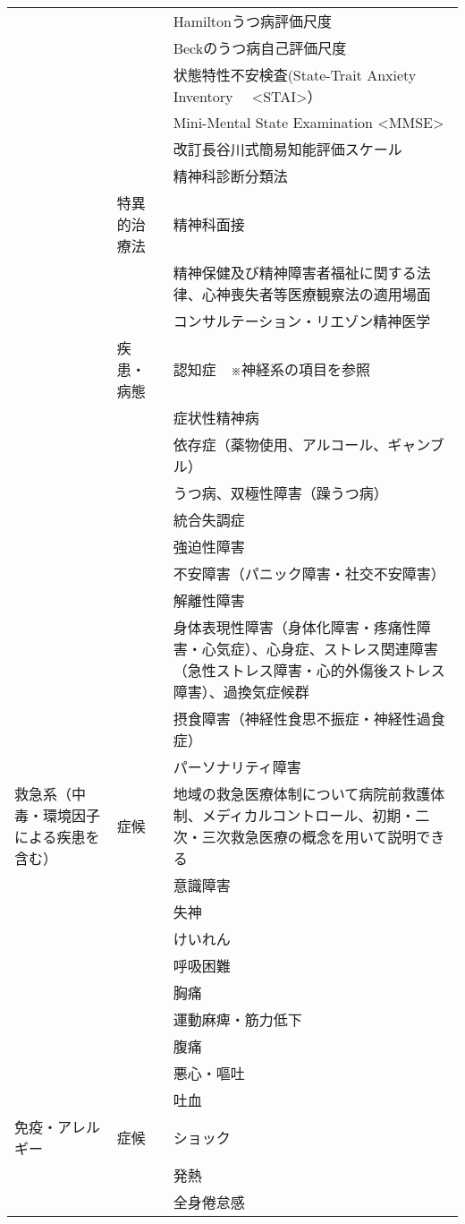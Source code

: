 \begin{xltabular}{\linewidth}{XXX}
 &  & Hamiltonうつ病評価尺度 \\
 &  & Beckのうつ病自己評価尺度 \\
 &  & 状態特性不安検査(State-Trait Anxiety Inventory　 <STAI>） \\
 &  & Mini-Mental State Examination <MMSE> \\
 &  & 改訂長谷川式簡易知能評価スケール \\
 &  & 精神科診断分類法 \\
 & 特異的治療法 & 精神科面接 \\
 &  & 精神保健及び精神障害者福祉に関する法律、心神喪失者等医療観察法の適用場面 \\
 &  & コンサルテーション・リエゾン精神医学 \\
 & 疾患・病態 & 認知症　※神経系の項目を参照 \\
 &  & 症状性精神病 \\
 &  & 依存症（薬物使用、アルコール、ギャンブル） \\
 &  & うつ病、双極性障害（躁うつ病） \\
 &  & 統合失調症 \\
 &  & 強迫性障害 \\
 &  & 不安障害（パニック障害・社交不安障害） \\
 &  & 解離性障害 \\
 &  & 身体表現性障害（身体化障害・疼痛性障害・心気症）、心身症、ストレス関連障害（急性ストレス障害・心的外傷後ストレス障害）、過換気症候群 \\
 &  & 摂食障害（神経性食思不振症・神経性過食症） \\
 &  & パーソナリティ障害 \\
救急系（中毒・環境因子による疾患を含む） & 症候 & 地域の救急医療体制について病院前救護体制、メディカルコントロール、初期・二次・三次救急医療の概念を用いて説明できる \\
 &  & 意識障害 \\
 &  & 失神 \\
 &  & けいれん \\
 &  & 呼吸困難 \\
 &  & 胸痛 \\
 &  & 運動麻痺・筋力低下 \\
 &  & 腹痛 \\
 &  & 悪心・嘔吐 \\
 &  & 吐血 \\
免疫・アレルギー & 症候 & ショック \\
 &  & 発熱 \\
 &  & 全身倦怠感 \\

\end{xltabular}
